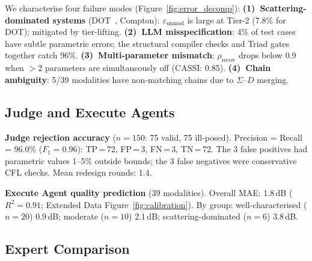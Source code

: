 \documentclass[11pt,a4paper]{article}
\newcommand{\eps}{\varepsilon}
\begin{document}
We characterise four failure modes (Figure~\ref{fig:error_decomp}):
\textbf{(1)~Scattering-dominated systems} (DOT~\cite{arridge2009optical}, Compton): $\eps_{\text{unmod}}$ is large at Tier-2 (7.8\% for DOT); mitigated by tier-lifting.
\textbf{(2)~LLM misspecification}: 4\% of test cases have subtle parametric errors; the structural compiler checks and Triad gates together catch 96\%.
\textbf{(3)~Multi-parameter mismatch}: $\rho_{\text{recov}}$ drops below 0.9 when $>$2 parameters are simultaneously off (CASSI: 0.85).
\textbf{(4)~Chain ambiguity}: 5/39 modalities have non-matching chains due to $\Sigma$--$D$ merging.

\subsection{Judge and Execute Agents}
\label{sec:agents}

\textbf{Judge rejection accuracy} ($n{=}150$: 75 valid, 75 ill-posed).  Precision = Recall = 96.0\% ($F_1 = 0.96$): TP\,=\,72, FP\,=\,3, FN\,=\,3, TN\,=\,72.  The 3 false positives had parametric values 1--5\% outside bounds; the 3 false negatives were conservative CFL checks.  Mean redesign rounds: 1.4.

\textbf{Execute Agent quality prediction} (39 modalities).  Overall MAE: 1.8\,dB ($R^2 = 0.91$; Extended Data Figure~\ref{fig:calibration}).  By group: well-characterised ($n{=}20$) 0.9\,dB; moderate ($n{=}10$) 2.1\,dB; scattering-dominated ($n{=}6$) 3.8\,dB.

\subsection{Expert Comparison}
\label{sec:expert}
\end{document}
